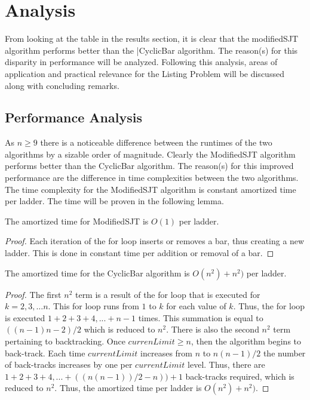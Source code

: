 
\section{Analysis}
From looking at the table in the results section, it is clear that the {\sc modifiedSJT} algorithm performs 
better than the  |{\sc CyclicBar} algorithm. The reason(s) for this disparity in performance 
will be analyzed. Following this analysis, areas of application and practical relevance for the Listing Problem 
will be discussed along with concluding remarks.

\subsection{Performance Analysis}
    As $n \geq 9$ there is a noticeable difference between the runtimes of the two algorithms by a sizable order 
    of magnitude. Clearly the {\sc ModifiedSJT} algorithm performs better than the {\sc CyclicBar} algorithm. The reason(s) 
    for this improved performance are the difference in time complexities between the two algorithms.
    The time complexity for the {\sc ModifiedSJT} algorithm is constant amortized time per ladder. The time will be proven in the following lemma.
    \begin{lemma}
        The amortized time for {\sc ModifiedSJT} is $O(1)$ per ladder.
    \end{lemma}
    \begin{proof}
        Each iteration of the for loop inserts or removes a bar, thus creating a new ladder. This is done in constant time 
        per addition or removal of a bar. 
    \end{proof}
    \begin{lemma}
       The amortized time for the  {\sc CyclicBar} algorithm is $O(n^{2}) + n^{2})$ per ladder.
    \end{lemma}
    \begin{proof}
        The first $n^{2}$ term is a result of the for loop that is executed for $k=2,3, \dots n$. This for loop runs 
        from $1$ to $k$ for each value of $k$. Thus, the for loop is executed $1 + 2 + 3 + 4, ... + n-1$ times. This summation 
        is equal to $((n-1)n-2)/2$ which is reduced to $n^{2}$. There is also the second $n^{2}$ term pertaining to backtracking. 
        Once $currenLimit \geq n$, then the algorithm 
        begins to back-track. Each time $currentLimit$ increases from $n$ to $n(n-1)/2$ the number of back-tracks increases by one per 
        $currentLimit$ level.
       Thus, there are $1 + 2 + 3 + 4, ... +  ((n(n-1))/2 - n)) + 1$ back-tracks required, which is reduced to $n^{2}$. Thus, the amortized  
       time per ladder is $O(n^{2}) + n^{2})$.
    \end{proof}


